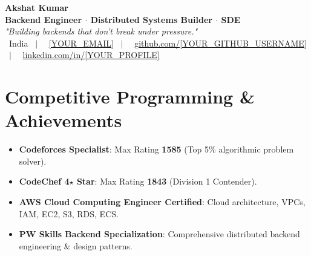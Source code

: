 \documentclass[11pt,a4paper]{article}
\begin{document}
\begin{center}
    {\Huge \textbf{\textcolor{secondary}{Akshat Kumar}}} \\ \vspace{4pt}
    {\large \textbf{Backend Engineer $\cdot$ Distributed Systems Builder $\cdot$ SDE}} \\ \vspace{4pt}
    \textit{"Building backends that don't break under pressure."} \\ \vspace{6pt}
    \faMapMarker* \ India \ $\vert$ \
    \faEnvelope \ \href{mailto:[YOUR_EMAIL]}{[YOUR_EMAIL]} \ $\vert$ \
    \faGithub \ \href{https://github.com/[YOUR_GITHUB_USERNAME]}{github.com/[YOUR_GITHUB_USERNAME]} \ $\vert$ \
    \faLinkedin \ \href{[YOUR_LINKEDIN_URL]}{linkedin.com/in/[YOUR_PROFILE]}
\end{center}

\vspace{-6pt}

\section{Competitive Programming \& Achievements}
\begin{itemize}[leftmargin=*,itemsep=2pt]
    \item \textbf{Codeforces Specialist}: Max Rating \textbf{1585} (Top 5\% algorithmic problem solver).
    \item \textbf{CodeChef 4$\star$ Star}: Max Rating \textbf{1843} (Division 1 Contender).
    \item \textbf{AWS Cloud Computing Engineer Certified}: Cloud architecture, VPCs, IAM, EC2, S3, RDS, ECS.
    \item \textbf{PW Skills Backend Specialization}: Comprehensive distributed backend engineering \& design patterns.
\end{itemize}

\end{document}
